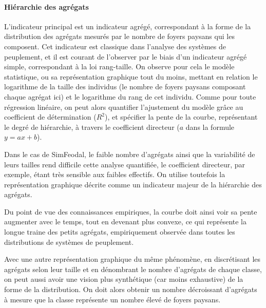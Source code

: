 \paragraph{Hiérarchie des agrégats}

L'indicateur principal est un indicateur agrégé, correspondant à la forme de la distribution des agrégats mesurés par le nombre de foyers paysans qui les composent. Cet indicateur est classique dans l'analyse des systèmes de peuplement, et il est courant de l'observer par le biais d'un indicateur agrégé simple, correspondant à la loi rang-taille. On observe pour cela le modèle statistique, ou sa représentation graphique tout du moins, mettant en relation le logarithme de la taille des individus (le nombre de foyers paysans composant chaque agrégat ici) et le logarithme du rang de cet individu. Comme pour toute régression linéaire, on peut alors quantifier l'ajustement du modèle grâce au coefficient de détermination ($R^2$), et spécifier la pente de la courbe, représentant le degré de hiérarchie, à travers le coefficient directeur ($a$ dans la formule $y = ax + b$).

Dans le cas de SimFeodal, le faible nombre d'agrégats ainsi que la variabilité de leurs tailles rend difficile cette analyse quantifiée, le coefficient directeur, par exemple, étant très sensible aux faibles effectifs. On utilise toutefois la représentation graphique décrite comme un indicateur majeur de la hiérarchie des agrégats.

Du point de vue des connaissances empiriques, la courbe doit ainsi voir sa pente augmenter avec le temps, tout en devenant plus convexe, ce qui représente la \og longue traine\fg{} des petits agrégats, empiriquement observée dans toutes les distributions de systèmes de peuplement.

Avec une autre représentation graphique du même phénomène, en discrétisant les agrégats selon leur taille et en dénombrant le nombre d'agrégats de chaque classe, on peut aussi avoir une vision plus synthétique (car moins exhaustive) de la forme de la distribution. On doit alors obtenir un nombre décroissant d'agrégats à mesure que la classe représente un nombre élevé de foyers paysans.


